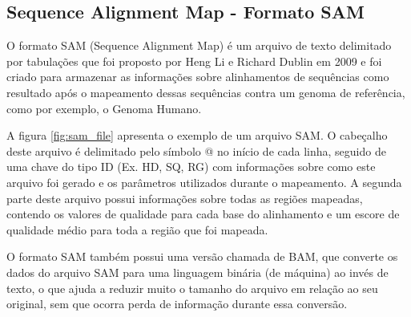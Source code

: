 \subsection{Sequence Alignment Map - Formato SAM}

O formato SAM (Sequence Alignment Map) é um arquivo de texto delimitado por tabulações que foi proposto por Heng Li e Richard Dublin em 2009 \cite{Li2009b} e foi criado para armazenar as informações sobre alinhamentos de sequências como resultado após o mapeamento dessas sequências contra um genoma de referência, como por exemplo, o Genoma Humano.

A figura \ref{fig:sam_file} apresenta o exemplo de um arquivo SAM. O cabeçalho deste arquivo é delimitado pelo símbolo @ no início de cada linha, seguido de uma chave do tipo ID (Ex. HD, SQ, RG) com informações sobre como este arquivo foi gerado e os parâmetros utilizados durante o mapeamento. A segunda parte deste arquivo possui informações sobre todas as regiões mapeadas, contendo os valores de qualidade para cada base do alinhamento e um escore de qualidade médio para toda a região que foi mapeada.

O formato SAM também possui uma versão chamada de BAM, que converte os dados do arquivo SAM para uma linguagem binária (de máquina) ao invés de texto, o que ajuda a reduzir muito o tamanho do arquivo em relação ao seu original, sem que ocorra perda de informação durante essa conversão.



